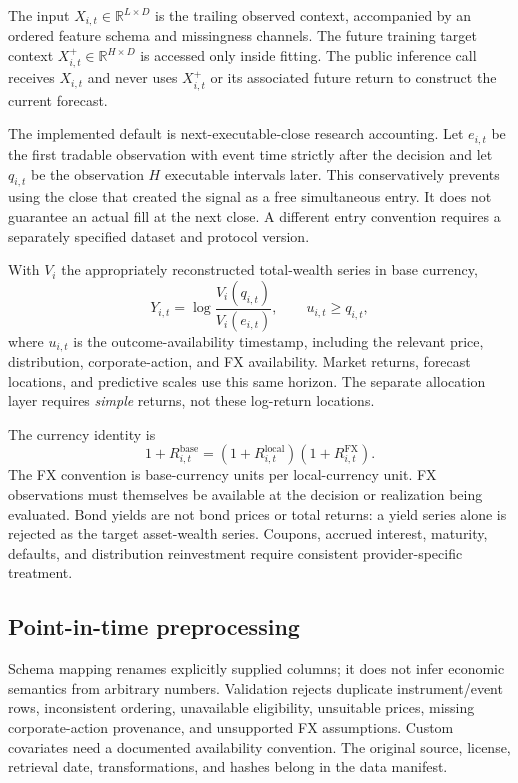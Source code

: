 \documentclass[11pt,a4paper]{article}
\newcommand{\R}{\mathbb R}
\begin{document}
The input $X_{i,t}\in\R^{L\times D}$ is the trailing observed context, accompanied by an ordered feature schema and missingness channels. The future training target context $X^+_{i,t}\in\R^{H\times D}$ is accessed only inside fitting. The public inference call receives $X_{i,t}$ and never uses $X^+_{i,t}$ or its associated future return to construct the current forecast.

The implemented default is next-executable-close research accounting. Let $e_{i,t}$ be the first tradable observation with event time strictly after the decision and let $q_{i,t}$ be the observation $H$ executable intervals later. This conservatively prevents using the close that created the signal as a free simultaneous entry. It does not guarantee an actual fill at the next close. A different entry convention requires a separately specified dataset and protocol version.

With $V_i$ the appropriately reconstructed total-wealth series in base currency,
\begin{equation}
Y_{i,t}=\log\frac{V_i(q_{i,t})}{V_i(e_{i,t})},\qquad
u_{i,t}\ge q_{i,t},
\end{equation}
where $u_{i,t}$ is the outcome-availability timestamp, including the relevant price, distribution, corporate-action, and FX availability. Market returns, forecast locations, and predictive scales use this same horizon. The separate allocation layer requires \emph{simple} returns, not these log-return locations.

The currency identity is
\begin{equation}
1+R^{\mathrm{base}}_{i,t}=(1+R^{\mathrm{local}}_{i,t})(1+R^{\mathrm{FX}}_{i,t}).
\end{equation}
The FX convention is base-currency units per local-currency unit. FX observations must themselves be available at the decision or realization being evaluated. Bond yields are not bond prices or total returns: a yield series alone is rejected as the target asset-wealth series. Coupons, accrued interest, maturity, defaults, and distribution reinvestment require consistent provider-specific treatment.

\subsection{Point-in-time preprocessing}

Schema mapping renames explicitly supplied columns; it does not infer economic semantics from arbitrary numbers. Validation rejects duplicate instrument/event rows, inconsistent ordering, unavailable eligibility, unsuitable prices, missing corporate-action provenance, and unsupported FX assumptions. Custom covariates need a documented availability convention. The original source, license, retrieval date, transformations, and hashes belong in the data manifest.
\end{document}
